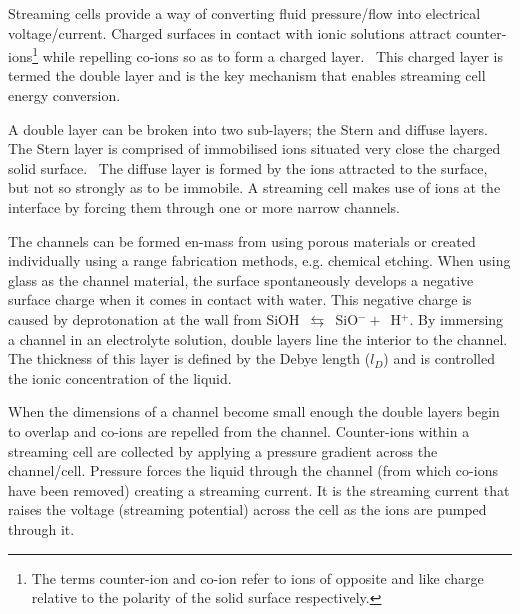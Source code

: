 \documentclass[10pt,final,journal]{IEEEtran}
\begin{document}
    Streaming cells provide a way of converting fluid pressure/flow into electrical voltage/current.
    Charged surfaces in contact with ionic solutions attract counter-ions\footnote{The terms counter-ion and co-ion refer to ions of opposite and like charge relative to the polarity of the solid surface respectively.} while repelling co-ions so as to form a charged layer.~\cite{Stein2004}
    This charged layer is termed the double layer and is the key mechanism that enables streaming cell energy conversion.

    A double layer can be broken into two sub-layers; the Stern and diffuse layers.
    The Stern layer is comprised of immobilised ions situated very close the charged solid surface.~\cite{Salieb-Beugelaar2009}
    The diffuse layer is formed by the ions attracted to the surface, but not so strongly as to be immobile.
    A streaming cell makes use of ions at the interface by forcing them through one or more narrow channels.

    The channels can be formed en-mass from using porous materials or created individually using a range fabrication methods, e.g. chemical etching.
    When using glass as the channel material, the surface spontaneously develops a negative surface charge when it comes in contact with water.
    This negative charge is caused by deprotonation at the wall from SiOH~$\leftrightarrows$~SiO$^{-}+$~H$^{+}$.
    By immersing a channel in an electrolyte solution, double layers line the interior to the channel.
    The thickness of this layer is defined by the Debye length ($l_{D}$) and is controlled the ionic concentration of the liquid.~\cite{Israelachvili2011}

    When the dimensions of a channel become small enough the double layers begin to overlap and co-ions are repelled from the channel.
    Counter-ions within a streaming cell are collected by applying a pressure gradient across the channel/cell.
    Pressure forces the liquid through the channel (from which co-ions have been removed) creating a streaming current.
    It is the streaming current that raises the voltage (streaming potential) across the cell as the ions are pumped through it.
\end{document}
